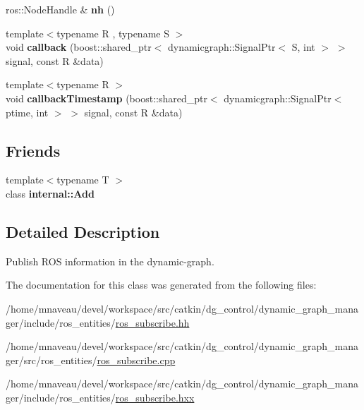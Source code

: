 \begin{DoxyCompactItemize}
\item 
ros\+::\+Node\+Handle \& {\bfseries nh} ()\hypertarget{classdynamic__graph_1_1RosSubscribe_a093c394243939de8a085ae774ad05493}{}\label{classdynamic__graph_1_1RosSubscribe_a093c394243939de8a085ae774ad05493}

\item 
{\footnotesize template$<$typename R , typename S $>$ }\\void {\bfseries callback} (boost\+::shared\+\_\+ptr$<$ dynamicgraph\+::\+Signal\+Ptr$<$ S, int $>$ $>$ signal, const R \&data)\hypertarget{classdynamic__graph_1_1RosSubscribe_acdf8089899afd8364f75ac2b70b3269f}{}\label{classdynamic__graph_1_1RosSubscribe_acdf8089899afd8364f75ac2b70b3269f}

\item 
{\footnotesize template$<$typename R $>$ }\\void {\bfseries callback\+Timestamp} (boost\+::shared\+\_\+ptr$<$ dynamicgraph\+::\+Signal\+Ptr$<$ ptime, int $>$ $>$ signal, const R \&data)\hypertarget{classdynamic__graph_1_1RosSubscribe_a6cb2a713a53d3cbebeeac921ba245954}{}\label{classdynamic__graph_1_1RosSubscribe_a6cb2a713a53d3cbebeeac921ba245954}

\end{DoxyCompactItemize}
\subsection*{Friends}
\begin{DoxyCompactItemize}
\item 
{\footnotesize template$<$typename T $>$ }\\class {\bfseries internal\+::\+Add}\hypertarget{classdynamic__graph_1_1RosSubscribe_aff86e359edc93019ec7be05f8207a40d}{}\label{classdynamic__graph_1_1RosSubscribe_aff86e359edc93019ec7be05f8207a40d}

\end{DoxyCompactItemize}


\subsection{Detailed Description}
Publish R\+OS information in the dynamic-\/graph. 

The documentation for this class was generated from the following files\+:\begin{DoxyCompactItemize}
\item 
/home/mnaveau/devel/workspace/src/catkin/dg\+\_\+control/dynamic\+\_\+graph\+\_\+manager/include/ros\+\_\+entities/\hyperlink{ros__subscribe_8hh}{ros\+\_\+subscribe.\+hh}\item 
/home/mnaveau/devel/workspace/src/catkin/dg\+\_\+control/dynamic\+\_\+graph\+\_\+manager/src/ros\+\_\+entities/\hyperlink{ros__subscribe_8cpp}{ros\+\_\+subscribe.\+cpp}\item 
/home/mnaveau/devel/workspace/src/catkin/dg\+\_\+control/dynamic\+\_\+graph\+\_\+manager/include/ros\+\_\+entities/\hyperlink{ros__subscribe_8hxx}{ros\+\_\+subscribe.\+hxx}\end{DoxyCompactItemize}
